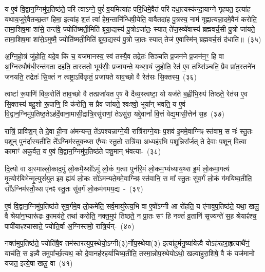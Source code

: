 य ए॒वं वि॒द्वान॒ग्निमु॑प॒तिष्ठ॑ते॒ परि॑ त्वाऽग्ने॒ पुरं॑ व॒यमित्या॑ह परि॒धिमे॒वैतं परि॑ दधा॒त्यस्क॑न्दा॒याग्ने॑ गृहपत॒ इत्या॑ह यथाय॒जुरे॒वैतच्छ॒तꣳ हिमा॒ इत्या॑ह श॒तं त्वा॑ हेम॒न्तानि॑न्धिषी॒\-येति॒ वावैतदा॑ह पु॒त्रस्य॒ नाम॑ गृह्णात्यन्ना॒दमे॒वैनं॑ करोति॒ तामा॒\-शिष॒मा शा॑से॒ तन्त॑वे॒ ज्योति॑ष्मती॒मिति॑ ब्रूया॒द्यस्य॑ पु॒त्रो\-ऽजा॑तः॒ स्यात् ते॑ज॒स्व्ये॑वास्य॑ ब्रह्मवर्च॒सी पु॒त्रो जा॑यते॒ तामा॒शिष॒मा शा॑से॒\-ऽमुष्मै॒ ज्योति॑ष्मती॒मिति॑ ब्रूया॒द्यस्य॑ पु॒त्रो जा॒तः स्यात् तेज॑ ए॒वास्मि॑न् ब्रह्मवर्च॒सं द॑धाति॥~(३५)

{}%

अ॒ग्नि॒हो॒त्रं जु॑होति॒ यदे॒व किं च॒ यज॑मानस्य॒ स्वं तस्यै॒व तद्रेतः॑ सिञ्चति प्र॒जन॑ने प्र॒जन॑न॒ꣳ॒ हि वा अ॒ग्निरथौष॑धी॒रन्त॑गता दहति॒ तास्ततो॒ भूय॑सीः॒ प्रजा॑यन्ते॒ यथ्सा॒यं जु॒होति॒ रेत॑ ए॒व तथ्सि॑ञ्चति॒ प्रैव प्रा॑त॒स्तने॑न जनयति॒ तद्रेतः॑ सि॒क्तं न त्वष्ट्रा\-ऽवि॑कृतं॒ प्रजा॑यते याव॒च्छो वै रेत॑सः सि॒क्तस्य॒~(३६)

त्वष्टा॑ रू॒पाणि॑ विक॒रोति॑ ताव॒च्छो वै तत्प्रजा॑यत ए॒ष वै दैव्य॒स्त्वष्टा॒ यो यज॑ते ब॒ह्वीभि॒रुप॑ तिष्ठते॒ रेत॑स ए॒व सि॒क्तस्य॑ बहु॒शो रू॒पाणि॒ वि क॑रोति॒ स प्रैव जा॑यते॒ श्वःश्वो॒ भूया᳚न् भवति॒ य ए॒वं वि॒द्वान॒ग्निमु॑प॒तिष्ठ॒ते\-ऽह॑र्दे॒वाना॒\-मासी॒द्रात्रि॒रसु॑राणां॒ ते\-ऽसु॑रा॒ यद्दे॒वानां᳚ वि॒त्तं वेद्य॒मासी॒त्तेन॑ स॒ह~(३७)

रात्रिं॒ प्रावि॑श॒न् ते दे॒वा ही॒ना अ॑मन्यन्त॒ ते॑\-ऽपश्यन्नाग्ने॒यी रात्रि॑राग्ने॒याः प॒शव॑ इ॒ममे॒वाग्निꣴ स्त॑वाम॒ स नः॑ स्तु॒तः प॒शून् पुन॑र्दास्य॒तीति॒ ते᳚\-ऽग्निम॑स्तुव॒न्थ्स ए᳚भ्यः स्तु॒तो रात्रि॑या॒ अध्यह॑र॒भि प॒शून्निरा᳚र्ज॒त् ते दे॒वाः प॒शून् वि॒त्वा कामाꣳ॑ अकुर्वत॒ य ए॒वं वि॒द्वान॒ग्निमु॑प॒तिष्ठ॑ते पशु॒मान् भ॑वत्या-~(३८)

दि॒त्यो वा अ॒स्माल्लो॒काद॒मुं लो॒कमै॒थ्सो॑\-ऽमुं लो॒कं ग॒त्वा पुन॑रि॒मं लो॒कम॒भ्य॑ध्याय॒थ्स इ॒मं लो॒कमा॒गत्य॑ मृ॒त्योर॑बिभेन्मृ॒त्युसं॑युत इव॒ ह्य॑यं लो॒कः सो॑\-ऽमन्यते॒ममे॒वाग्निꣴ स्त॑वानि॒ स मा᳚ स्तु॒तः सु॑व॒र्गं लो॒कं ग॑मयिष्य॒तीति॒ सो᳚\-ऽग्निम॑स्तौ॒थ्स ए॑नꣴ स्तु॒तः सु॑व॒र्गं लो॒कम॑गमय॒द्य~-~(३९)

ए॒वं वि॒द्वान॒ग्निमु॑प॒तिष्ठ॑ते सुव॒र्गमे॒व लो॒कमे॑ति॒ सर्व॒मायु॑रेत्य॒भि वा ए॒षो᳚\-ऽग्नी आ रो॑हति॒ य ए॑नावुप॒तिष्ठ॑ते॒ यथा॒ खलु॒ वै श्रेया॑न॒भ्यारू॑ढः का॒मय॑ते॒ तथा॑ करोति॒ नक्त॒मुप॑ तिष्ठते॒ न प्रा॒तः सꣳ हि नक्तं॑ व्र॒तानि॑ सृ॒ज्यन्ते॑ स॒ह श्रेयाꣴ॑श्च॒ पापी॑याꣴश्चासाते॒ ज्योति॒र्वा अ॒ग्निस्तमो॒ रात्रि॒र्यन्-~(४०)

नक्त॑मुप॒तिष्ठ॑ते॒ ज्योति॑षै॒व तम॑स्तरत्युप॒स्थेयो॒\-ऽग्नी(३)र्नोप॒\-स्थेया(३) इत्या॑हुर्मनु॒ष्या॑येन्न्वै यो\-ऽह॑रहरा॒हृत्या\-थै॑नं॒ याच॑ति॒ स इन्न्वै तमुपा᳚र्च्छ॒त्यथ॒ को दे॒वानह॑रहर्याचिष्य॒तीति॒ तस्मा॒न्नोप॒स्थेयो\-ऽथो॒ खल्वा॑हुरा॒शिषे॒ वै कं यज॑मानो यजत॒ इत्ये॒षा खलु॒ वा~(४१)

